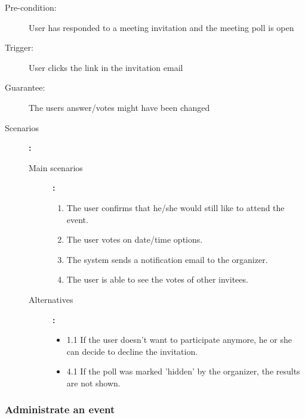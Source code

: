 \begin{description}
	\item[Pre-condition:] User has responded to a meeting invitation and the meeting poll is open
	\item[Trigger:] User clicks the link in the invitation email
	\item[Guarantee:] The users answer/votes might have been changed
	\item[Scenarios]\textbf{:}\\
				\begin{description}
					\item[Main scenarios]\textbf{:}\\
								\begin{enumerate}
									\item The user confirms that he/she would still like to attend the event.
									\item The user votes on date/time options.
									\item The system sends a notification email to the organizer.
									\item The user is able to see the votes of other invitees.
								\end{enumerate}
					\item[Alternatives]\textbf{:}\\
								\begin{itemize}
									\item 1.1 If the user doesn't want to participate anymore, he or she can decide to decline the invitation.
									\item 4.1 If the poll was marked 'hidden' by the organizer, the results are not shown.
								\end{itemize}
				\end{description}
\end{description}

\subsubsection{Administrate an event}


